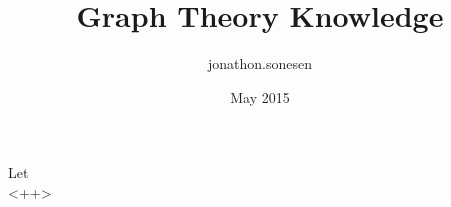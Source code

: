 \documentclass[fleqn]{article}
\title{Graph Theory Knowledge}
\author{jonathon.sonesen }
\date{May 2015}
\begin{document}
\maketitle

\section{}
Let 
\begin{equation}
  
  \label{<++>}
\end{equation}<++>
\end{document}
